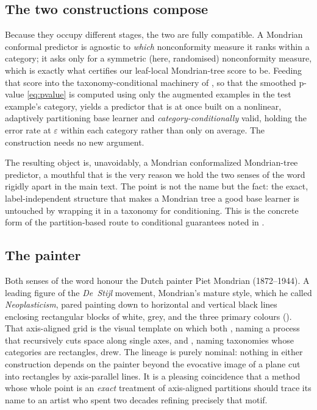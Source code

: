 \documentclass[twoside]{article}
\numberwithin{equation}{section}
\theoremstyle{plain}
\theoremstyle{definition}
\theoremstyle{remark}
\begin{document}
\subsection{The two constructions compose}\label{app:mondrian-compose}

Because they occupy different stages, the two are fully compatible. A Mondrian conformal
predictor is agnostic to \emph{which} nonconformity measure it ranks within a category; it
asks only for a symmetric (here, randomised) nonconformity measure, which is exactly what
 certifies our leaf-local Mondrian-tree score to be. Feeding that
score into the taxonomy-conditional machinery of \citet[\S4.6]{alrw2}, so that the smoothed
p-value \eqref{eq:pvalue} is computed using only the augmented examples in the test
example's category, yields a predictor that is at once built on a nonlinear, adaptively
partitioning base learner and \emph{category-conditionally} valid, holding the error rate at
$\varepsilon$ within each category rather than only on average. The construction needs no new
argument.

The resulting object is, unavoidably, a Mondrian conformalized Mondrian-tree predictor, a
mouthful that is the very reason we hold the two senses of the word rigidly apart in the
main text. The point is not the name but the fact: the exact, label-independent structure
that makes a Mondrian tree a good base learner is untouched by wrapping it in a taxonomy for
conditioning. This is the concrete form of the partition-based route to conditional
guarantees noted in .

\subsection{The painter}\label{app:mondrian-painter}

Both senses of the word honour the Dutch painter Piet Mondrian (1872--1944). A leading
figure of the \emph{De~Stijl} movement, Mondrian's mature style, which he called
\emph{Neoplasticism}, pared painting down to horizontal and vertical black lines enclosing
rectangular blocks of white, grey, and the three primary colours
(). That axis-aligned grid is the visual template on which both
\citet{roy2009mondrian}, naming a process that recursively cuts space along single axes,
and \citet{alrw2}, naming taxonomies whose categories are rectangles, drew. The lineage is
purely nominal: nothing in either construction depends on the painter beyond the evocative
image of a plane cut into rectangles by axis-parallel lines. It is a pleasing coincidence
that a method whose whole point is an \emph{exact} treatment of axis-aligned partitions
should trace its name to an artist who spent two decades refining precisely that motif.
\end{document}
